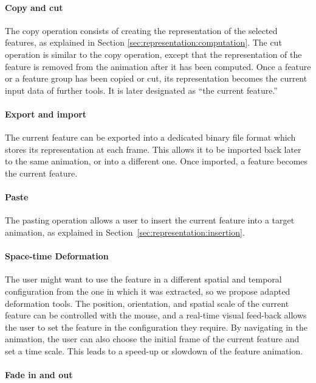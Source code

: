 \paragraph{Copy and cut}

The copy operation consists of creating the representation of the selected features, as explained in Section \ref{sec:representation:computation}.
The cut operation is similar to the copy operation, except that the representation of the feature is removed from the animation after it has been computed. 
Once a feature or a feature group has been copied or cut, its representation becomes the current input data of further tools.
It is later designated as ``the current feature.''

\paragraph{Export and import}

The current feature can be exported into a dedicated binary file format which stores its representation at each frame.
This allows it to be imported back later to the same animation, or into a different one.
Once imported, a feature becomes the current feature.

\paragraph{Paste}

The pasting operation allows a user to insert the current feature into a target animation, as explained in Section~\ref{sec:representation:insertion}.

\paragraph{Space-time Deformation}

The user might want to use the feature in a different spatial and temporal configuration from the one in which it was extracted, so we propose adapted deformation tools.
The position, orientation, and spatial scale of the current feature can be controlled with the mouse, and a real-time visual feed-back allows the user to set the feature in the configuration they require. 
By navigating in the animation, the user can also choose the initial frame of the current feature and set a time scale. 
This leads to a speed-up or slowdown of the feature animation.

\paragraph{Fade in and out}

